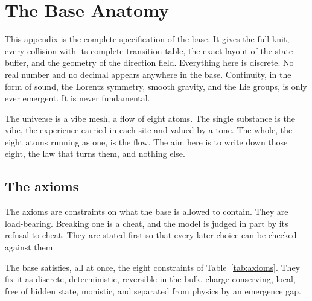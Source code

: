 \section{The Base Anatomy}

This appendix is the complete specification of the base. It gives the full knit, every collision with its complete transition table, the exact layout of the state buffer, and the geometry of the direction field. Everything here is discrete. No real number and no decimal appears anywhere in the base. Continuity, in the form of sound, the Lorentz symmetry, smooth gravity, and the Lie groups, is only ever emergent. It is never fundamental.

The universe is a vibe mesh, a flow of eight atoms. The single substance is the vibe, the experience carried in each site and valued by a tone. The whole, the eight atoms running as one, is the flow. The aim here is to write down those eight, the law that turns them, and nothing else.

\subsection{The axioms}

The axioms are constraints on what the base is allowed to contain. They are load-bearing. Breaking one is a cheat, and the model is judged in part by its refusal to cheat. They are stated first so that every later choice can be checked against them.

\begin{axiom}
The base satisfies, all at once, the eight constraints of Table~\ref{tab:axioms}. They fix it as discrete, deterministic, reversible in the bulk, charge-conserving, local, free of hidden state, monistic, and separated from physics by an emergence gap.
\end{axiom}


